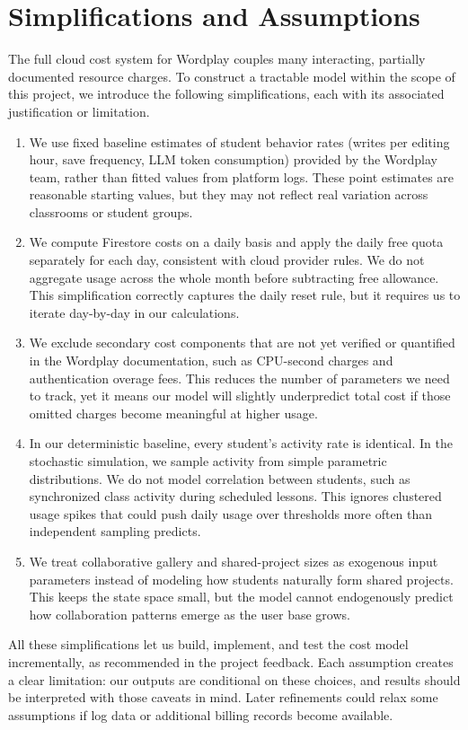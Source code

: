 \documentclass{article}
\begin{document}
\section{Simplifications and Assumptions}
The full cloud cost system for Wordplay couples many interacting, partially documented resource charges. To construct a tractable model within the scope of this project, we introduce the following simplifications, each with its associated justification or limitation.
\begin{enumerate}
    \item We use fixed baseline estimates of student behavior rates (writes per editing hour, save frequency, LLM token consumption) provided by the Wordplay team, rather than fitted values from platform logs. These point estimates are reasonable starting values, but they may not reflect real variation across classrooms or student groups.
    \item We compute Firestore costs on a daily basis and apply the daily free quota separately for each day, consistent with cloud provider rules. We do not aggregate usage across the whole month before subtracting free allowance. This simplification correctly captures the daily reset rule, but it requires us to iterate day-by-day in our calculations.
    \item We exclude secondary cost components that are not yet verified or quantified in the Wordplay documentation, such as CPU-second charges and authentication overage fees. This reduces the number of parameters we need to track, yet it means our model will slightly underpredict total cost if those omitted charges become meaningful at higher usage.
    \item In our deterministic baseline, every student’s activity rate is identical. In the stochastic simulation, we sample activity from simple parametric distributions. We do not model correlation between students, such as synchronized class activity during scheduled lessons. This ignores clustered usage spikes that could push daily usage over thresholds more often than independent sampling predicts.
    \item We treat collaborative gallery and shared-project sizes as exogenous input parameters instead of modeling how students naturally form shared projects. This keeps the state space small, but the model cannot endogenously predict how collaboration patterns emerge as the user base grows.
\end{enumerate}

All these simplifications let us build, implement, and test the cost model incrementally, as recommended in the project feedback. Each assumption creates a clear limitation: our outputs are conditional on these choices, and results should be interpreted with those caveats in mind. Later refinements could relax some assumptions if log data or additional billing records become available.
\end{document}
